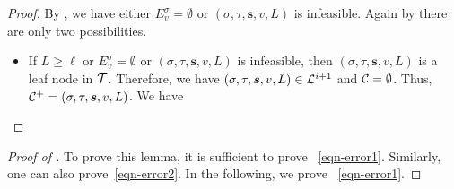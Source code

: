 \documentclass[11pt]{article}
\newcommand{\seqS}{\boldsymbol{s}}
\begin{document}
\begin{proof}
By ,
we have either $E_v^{\sigma}=\emptyset$ or $(\sigma, \tau, \seqS, v, L)$ is infeasible.
Again by 
there are only two possibilities.
\begin{itemize}
\item If $L\geq \ell$ or $E_v^{\sigma}=\emptyset$ or $(\sigma, \tau, \seqS, v, L)$ is infeasible, then $(\sigma,\tau,\seqS,v,L)$ is a leaf node in $\mathcal{T}$.
Therefore, we have $(\sigma,\tau,\seqS,v,L)\in \+L^{i+1}$ and $\mathcal{C} = \emptyset$.
Thus, $\+C^+ = (\sigma, \tau, \seqS, v, L)$.
We have 
\end{itemize}
\end{proof}




\begin{proof}[Proof of ]
To prove this lemma, it is sufficient to prove ~\eqref{eqn-error1}.
Similarly, one can also prove~\eqref{eqn-error2}.
In the following, we prove ~\eqref{eqn-error1}.


\end{proof}
\end{document}
